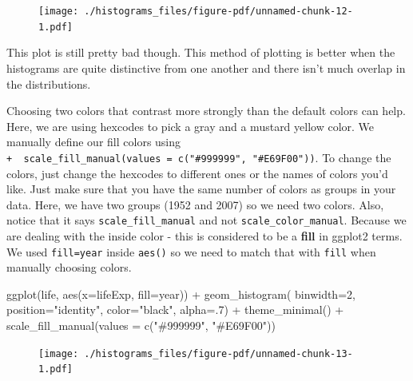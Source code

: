 \documentclass[
  letterpaper,
  DIV=11,
  numbers=noendperiod]{scrreprt}
\newenvironment{Shaded}{\begin{snugshade}}{\end{snugshade}}
\newcommand{\AttributeTok}[1]{\textcolor[rgb]{0.40,0.45,0.13}{#1}}
\newcommand{\DecValTok}[1]{\textcolor[rgb]{0.68,0.00,0.00}{#1}}
\newcommand{\FunctionTok}[1]{\textcolor[rgb]{0.28,0.35,0.67}{#1}}
\newcommand{\NormalTok}[1]{\textcolor[rgb]{0.00,0.23,0.31}{#1}}
\newcommand{\SpecialCharTok}[1]{\textcolor[rgb]{0.37,0.37,0.37}{#1}}
\newcommand{\StringTok}[1]{\textcolor[rgb]{0.13,0.47,0.30}{#1}}
\begin{document}
\begin{figure}[H]

{\centering \texttt{[image: ./histograms\_files/figure-pdf/unnamed-chunk-12-1.pdf]}

}

\end{figure}

This plot is still pretty bad though. This method of plotting is better
when the histograms are quite distinctive from one another and there
isn't much overlap in the distributions.

Choosing two colors that contrast more strongly than the default colors
can help. Here, we are using hexcodes to pick a gray and a mustard
yellow color. We manually define our fill colors using
\texttt{+\ \ scale\_fill\_manual(values\ =\ c("\#999999",\ "\#E69F00"))}.
To change the colors, just change the hexcodes to different ones or the
names of colors you'd like. Just make sure that you have the same number
of colors as groups in your data. Here, we have two groups (1952 and
2007) so we need two colors. Also, notice that it says
\texttt{scale\_fill\_manual} and not \texttt{scale\_color\_manual}.
Because we are dealing with the inside color - this is considered to be
a \textbf{fill} in ggplot2 terms. We used \texttt{fill=year} inside
\texttt{aes()} so we need to match that with \texttt{fill} when manually
choosing colors.

\begin{Shaded}
\begin{Highlighting}[]
\FunctionTok{ggplot}\NormalTok{(life, }\FunctionTok{aes}\NormalTok{(}\AttributeTok{x=}\NormalTok{lifeExp, }\AttributeTok{fill=}\NormalTok{year)) }\SpecialCharTok{+}  
  \FunctionTok{geom\_histogram}\NormalTok{( }\AttributeTok{binwidth=}\DecValTok{2}\NormalTok{, }\AttributeTok{position=}\StringTok{"identity"}\NormalTok{, }\AttributeTok{color=}\StringTok{"black"}\NormalTok{, }\AttributeTok{alpha=}\NormalTok{.}\DecValTok{7}\NormalTok{) }\SpecialCharTok{+}
  \FunctionTok{theme\_minimal}\NormalTok{() }\SpecialCharTok{+}
  \FunctionTok{scale\_fill\_manual}\NormalTok{(}\AttributeTok{values =} \FunctionTok{c}\NormalTok{(}\StringTok{"\#999999"}\NormalTok{, }\StringTok{"\#E69F00"}\NormalTok{))}
\end{Highlighting}
\end{Shaded}

\begin{figure}[H]

{\centering \texttt{[image: ./histograms\_files/figure-pdf/unnamed-chunk-13-1.pdf]}

}

\end{figure}
\end{document}
